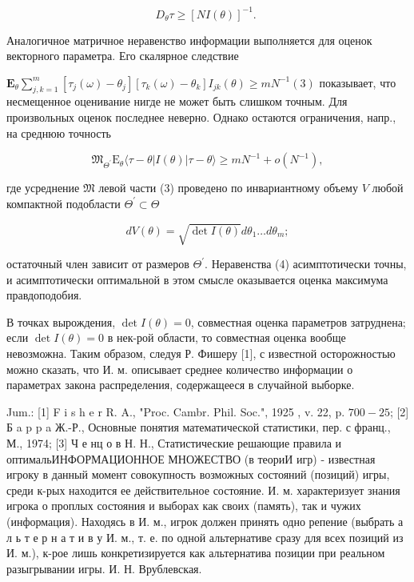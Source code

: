 \documentclass[10pt]{article}
\begin{document}
\[

D_{\theta} \tau \geqslant[N I(\theta)]^{-1} \text {. }

\]



Аналогичное матричное неравенство информации выполняется для оценок векторного параметра. Его скалярное следствие



$\mathbf{E}_{\theta} \sum_{j, k=1}^{m}\left[\tau_{j}(\omega)-\theta_{j}\right]\left[\tau_{k}(\omega)-\theta_{k}\right] I_{j k}(\theta) \geqslant m N^{-1}(3)$ показывает, что несмещенное оценивание нигде не может быть слишком точным. Для произвольных оценок последнее неверно. Однако остаются ограничения, напр., на среднюю точность



\[

\mathfrak{M}_{\Theta^{\prime}} \mathrm{E}_{\theta}\langle\tau-\theta|I(\theta)| \tau-\theta\rangle \geqslant m N^{-1}+o\left(N^{-1}\right),

\]



где усреднение $\mathfrak{M}$ левой части (3) проведено по инвариантному объему $V$ любой компактной подобласти $\Theta^{\prime} \subset \Theta$



\[

d V(\theta)=\sqrt{\operatorname{det} I(\theta)} d \theta_{1} \ldots d \theta_{m} ;

\]



остаточный член зависит от размеров $\Theta^{\prime}$. Неравенства (4) асимптотически точны, и асимптотически оптимальной в этом смысле оказывается оценка максимума правдоподобия.



В точках вырождения, $\operatorname{det} I(\theta)=0$, совместная оценка параметров затруднена; если $\operatorname{det} I(\theta)=0$ в нек-рой области, то совместная оценка вообще невозможна. Таким образом, следуя Р. Фишеру [1], с известной осторожностью можно сказать, что И. м. описывает среднее количество информации о параметрах закона распределения, содержащееся в случайной выборке.



Jum.: [1] F i s h e r R. A., "Proc. Cambr. Phil. Soc.", 1925 , v. 22, p. $700-25$; [2] Б a p p a Ж.-Р., Основные понятия математической статистики, пер. с франц., М., 1974; [3] Ч е нц о в Н. Н., Статистические решающие правила и оптимальИНФОРМАЦИОННОЕ МНОЖЕСТВО (в теориИ игр) - известная игроку в данный момент совокупность возможных состояний (позиций) игры, среди к-рых находится ее действительное состояние. И. м. характеризует знания игрока о проплых состояния и выборах как своих (память), так и чужих (информация). Находясь в И. м., игрок должен принять одно репение (выбрать а л ь т е р н а т и в у И. м., т. е. по одной альтернативе сразу для всех позиций из И. м.), к-рое лишь конкретизируется как альтернатива позиции при реальном разыгрывании игры. И. Н. Врублевская.
\end{document}

